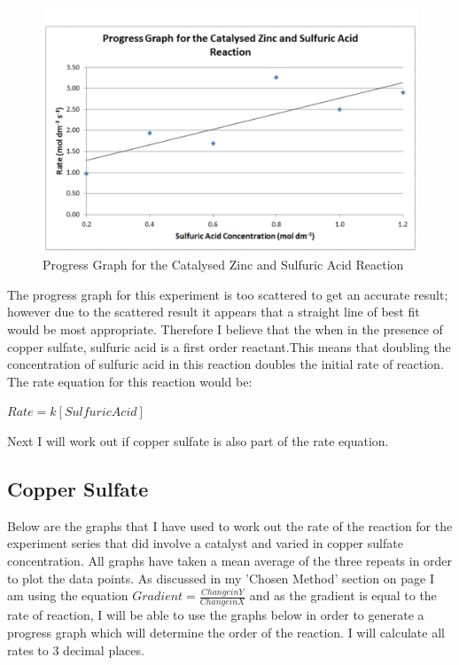 \begin{figure}[H]
    \includegraphics[width=\textwidth]{./Analysis/Images/2Catalysed/ProgressGraph.pdf}
    \caption{Progress Graph for the Catalysed Zinc and Sulfuric Acid Reaction} \label{fig:ProgressGraphSACS}
\end{figure}

The progress graph for this experiment is too scattered to get an accurate result; however due to the scattered result it appears that a straight line of best fit would be most appropriate. Therefore I believe that the when in the presence of copper sulfate, sulfuric acid is a first order reactant.This means that doubling the concentration of sulfuric acid in this reaction doubles the initial rate of reaction. The rate equation for this reaction would be:

$Rate = k [Sulfuric Acid]$

Next I will work out if copper sulfate is also part of the rate equation.

	\subsection{Copper Sulfate}
Below are the graphs that I have used to work out the rate of the reaction for the experiment series that did involve a catalyst and varied in copper sulfate concentration. All graphs have taken a mean average of the three repeats in order to plot the data points. As discussed in my 'Chosen Method' section on page \pageref{Chosen Method} I am using the equation $Gradient = \frac{Change in Y}{Change in X}$ and as the gradient is equal to the rate of reaction, I will be able to use the graphs below in order to generate a progress graph which will determine the order of the reaction. I will calculate all rates to 3 decimal places.


